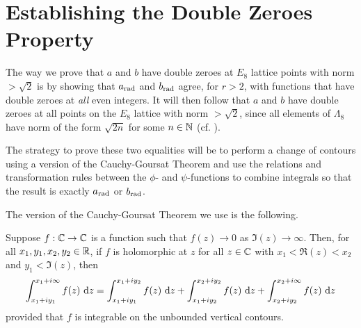 \section{Establishing the Double Zeroes Property}
\label{Ch4:Sec:Double_Zeroes}


The way we prove that $a$ and $b$ have double zeroes at $E_8$ lattice points with norm $> \sqrt{2}$ is by showing that $a_{\operatorname{rad}}$ and $b_{\operatorname{rad}}$ agree, for $r > 2$, with functions that have double zeroes at \textit{all} even integers. It will then follow that $a$ and $b$ have double zeroes at all points on the $E_8$ lattice with norm $> \sqrt{2}$, since all elements of $\Lambda_8$ have norm of the form $\sqrt{2n}$ for some $n \in \mathbb{N}$ (cf. ).

The strategy to prove these two equalities will be to perform a change of contours using a version of the Cauchy-Goursat Theorem and use the relations and transformation rules between the $\phi$- and $\psi$-functions to combine integrals so that the result is exactly $a_{\operatorname{rad}}$ or $b_{\operatorname{rad}}$.

The version of the Cauchy-Goursat Theorem we use is the following.

\begin{boxtheorem}\label{Ch4:Thm:CauchyGoursat_Unbounded}
    Suppose $f : \mathbb{C} \to \mathbb{C}$ is a function such that $f(z) \to 0$ as $\Im(z) \to \infty$. Then, for all $x_1, y_1, x_2, y_2 \in \mathbb{R}$, if $f$ is holomorphic at $z$ for all $z \in \mathbb{C}$ with $x_1 < \Re(z) < x_2$ and $y_1 < \Im(z)$, then
    \begin{align*}
        \int_{x_1 + iy_1}^{x_1 + i\infty} f(z) \, \operatorname{d}\!{z}
        = \int_{x_1 + iy_1}^{x_1 + iy_2} f(z) \, \operatorname{d}\!{z}
        + \int_{x_1 + iy_2}^{x_2 + iy_2} f(z) \, \operatorname{d}\!{z}
        + \int_{x_2 + iy_2}^{x_2 + i\infty} f(z) \, \operatorname{d}\!{z}
    \end{align*}
    provided that $f$ is integrable on the unbounded vertical contours.
\end{boxtheorem}

